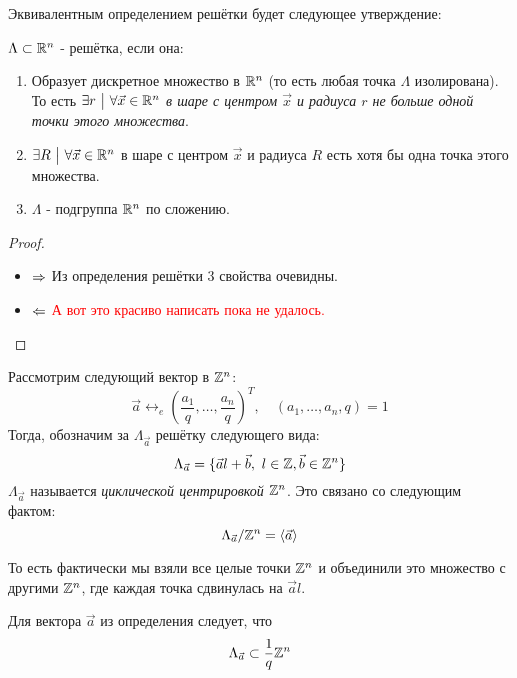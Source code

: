 \begin{proposition}
	Эквивалентным определением решётки будет следующее утверждение:
	
	$\Lambda \subset \mathbb{R}^n$ - решётка, если она:
	\begin{enumerate}
		\item Образует дискретное множество в $\mathbb{R}^n$ (то есть любая точка $\Lambda$ изолирована). То есть $\exists r \ \big|\  \forall \vec{x} \in \mathbb{R}^n$ \textit{в шаре с центром $\vec{x}$ и радиуса $r$ не больше одной точки этого множества}.
		
		\item $\exists R \ \big|\  \forall \vec{x} \in \mathbb{R}^n$ в шаре с центром $\vec{x}$ и радиуса $R$ есть хотя бы одна точка этого множества.
		
		\item $\Lambda$ - подгруппа $\mathbb{R}^n$ по сложению.
	\end{enumerate}
\end{proposition}

\begin{proof}~
	\begin{itemize}
		\item $\Rightarrow$ Из определения решётки 3 свойства очевидны.
		
		\item $\Leftarrow$ \textcolor{red}{А вот это красиво написать пока не удалось.}
	\end{itemize}
\end{proof}

\begin{definition}
	Рассмотрим следующий вектор в $\mathbb{Z}^n$:
	\[
		\vec{a} \leftrightarrow_e \left(\frac{a_1}{q}, \ldots, \frac{a_n}{q}\right)^T,\quad (a_1, \ldots, a_n, q) = 1
	\]
	Тогда, обозначим за $\Lambda_{\vec{a}}$ решётку следующего вида:
	\[
		\Lambda_{\vec{a}} = \{\vec{a}l + \vec{b},\ l \in \mathbb{Z}, \vec{b} \in \mathbb{Z}^n\}
	\]
	$\Lambda_{\vec{a}}$ называется \textit{циклической центрировкой} $\mathbb{Z}^n$. Это связано со следующим фактом:
	\[
		\Lambda_{\vec{a}} / \mathbb{Z}^n = \left\langle \vec{a} \right\rangle
	\]
\end{definition}

\begin{note}
	То есть фактически мы взяли все целые точки $\mathbb{Z}^n$ и объединили это множество с другими $\mathbb{Z}^n$, где каждая точка сдвинулась на $\vec{a}l$.
\end{note}

\begin{proposition}
	Для вектора $\vec{a}$ из определения следует, что
	\[
		\Lambda_{\vec{a}} \subset \frac{1}{q} \mathbb{Z}^n
	\]
\end{proposition}

